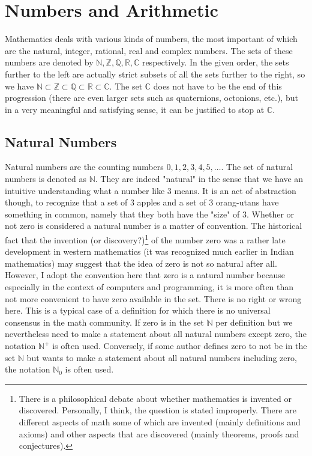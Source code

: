 \section{Numbers and Arithmetic} 

Mathematics deals with various kinds of numbers, the most important of which are the natural, integer, rational, real and complex numbers. The sets of these numbers are denoted by  $\mathbb{N,Z,Q,R,C}$ respectively. In the given order, the sets further to the left are actually strict subsets of all the sets further to the right, so we have $\mathbb{N \subset Z \subset Q \subset R \subset C}$. The set $\mathbb{C}$ does not have to be the end of this progression (there are even larger sets such as quaternions, octonions, etc.), but in a very meaningful and satisfying sense, it can be justified to stop at $\mathbb{C}$.

\subsection{Natural Numbers}
Natural numbers are the counting numbers $0,1,2,3,4,5,\ldots$. The set of natural numbers is denoted as $\mathbb{N}$. They are indeed "natural" in the sense that we have an intuitive understanding what a number like $3$ means. It is an act of abstraction though, to recognize that a set of 3 apples and a set of 3 orang-utans have something in common, namely that they both have the "size" of 3. Whether or not zero is considered a natural number is a matter of convention. The historical fact that the invention (or discovery?)\footnote{There is a philosophical debate about whether mathematics is invented or discovered. Personally, I think, the question is stated improperly. There are different aspects of math some of which are invented (mainly definitions and axioms) and other aspects that are discovered (mainly theorems, proofs and conjectures).} of the number zero was a rather late development in western mathematics (it was recognized much earlier in Indian mathematics) may suggest that the idea of zero is not so natural after all. However, I adopt the convention here that zero is a natural number because especially in the context of computers and programming, it is more often than not more convenient to have zero available in the set. There is no right or wrong here. This is a typical case of a definition for which there is no universal consensus in the math community. If zero is in the set $\mathbb{N}$ per definition but we nevertheless need to make a statement about all natural numbers except zero, the notation $\mathbb{N}^+$ is often used. Conversely, if some author defines zero to not be in the set $\mathbb{N}$ but wants to make a statement about all natural numbers including zero, the notation $\mathbb{N}_0$ is often used.

